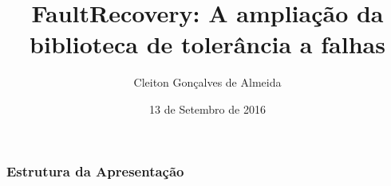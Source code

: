 \documentclass[a4paper,12pt,brazil]{beamer}
\title[Trabalho de Conclusão de Curso]{FaultRecovery: A ampliação da biblioteca de tolerância a falhas}
\author{Cleiton Gonçalves de Almeida} %
\institute[CPCX-UFMS] %
{
	Orientador: Prof. Me. Kleber Kruger \\ 
	Campus Coxim \\ 
	Universidade Federal de Mato Grosso do Sul \\ %
	\medskip 
	\textit{cleitonufms@hotmail.com} %
}
\date{13 de Setembro de 2016} %
\begin{document}
	
	\begin{frame}
		\titlepage %
	\end{frame}
	
	\begin{frame}
		\frametitle{Estrutura da Apresentação} %
		\tableofcontents %
	\end{frame}
	
	
	
\end{document}
